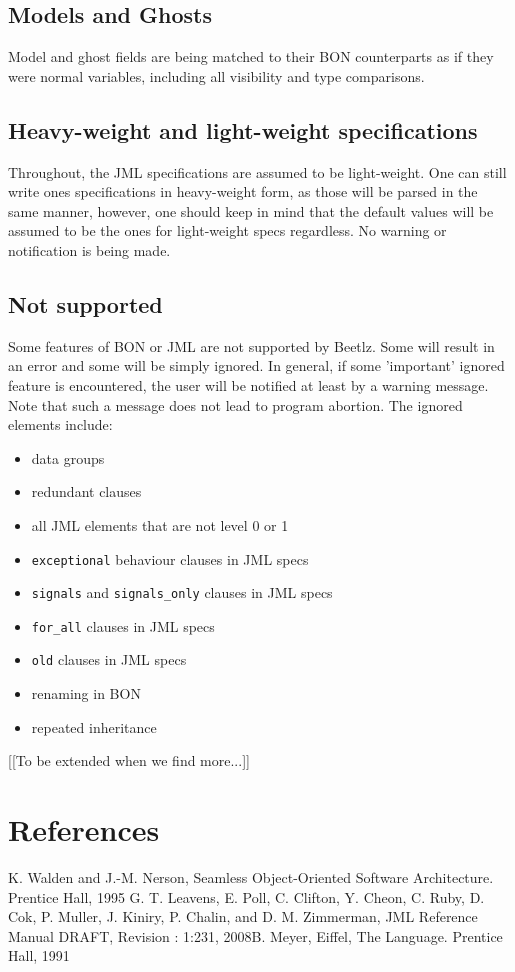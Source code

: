 \documentclass[11pt]{amsart}
\begin{document}
\subsection{Models and Ghosts}\hfill \newline
Model and ghost fields are being matched to their BON counterparts as if they were normal variables, including all visibility and type comparisons.

\subsection{Heavy-weight and light-weight specifications}\hfill \newline
Throughout, the JML specifications are assumed to be light-weight. One can still write ones specifications in heavy-weight form, as those will be parsed in the same manner, however, one should keep in mind that the default values will be assumed to be the ones for light-weight specs regardless. No warning or notification is being made.


\subsection{Not supported}\hfill \newline
Some features of BON or JML are not supported by Beetlz. Some will result in an error and some will be simply ignored. In general, if some 'important' ignored feature is encountered, the user will be notified at least by a warning message. Note that such a message does not lead to program abortion. The ignored elements include:
\begin{itemize}
\item data groups
\item redundant clauses
\item all JML elements that are not level 0 or 1
\item \texttt{exceptional} behaviour clauses in JML specs
\item \texttt{signals} and \texttt{signals\_only} clauses in JML specs
\item \texttt{for\_all} clauses in JML specs
\item \texttt{old} clauses in JML specs
\item renaming in BON
\item repeated inheritance
\end{itemize}
[[To be extended when we find more...]]


\section*{References}\hfill \newline
[1] K. Walden and J.-M. Nerson, Seamless Object-Oriented Software Architecture. Prentice
Hall, 1995 \newline
[2] G. T. Leavens, E. Poll, C. Clifton, Y. Cheon, C. Ruby, D. Cok, P. Muller, J. Kiniry,
P. Chalin, and D. M. Zimmerman, JML Reference Manual DRAFT, Revision : 1:231,
2008\newline
[3] B. Meyer, Eiffel, The Language. Prentice Hall, 1991
\end{document}
